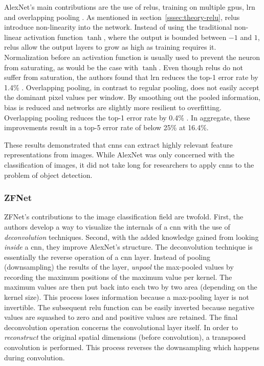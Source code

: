 \documentclass[final]{vutinfth} %
\begin{document}
AlexNet's main contributions are the use of \glspl{relu}, training on
multiple \glspl{gpu}, \gls{lrn} and overlapping pooling
\cite{krizhevsky2012}. As mentioned in
section~\ref{sssec:theory-relu}, \glspl{relu} introduce non-linearity
into the network. Instead of using the traditional non-linear
activation function $\tanh$, where the output is bounded between $-1$
and $1$, \glspl{relu} allow the output layers to grow as high as
training requires it. Normalization before an activation function is
usually used to prevent the neuron from saturating, as would be the
case with $\tanh$. Even though \glspl{relu} do not suffer from
saturation, the authors found that \gls{lrn} reduces the top-1 error
rate by 1.4\% \cite{krizhevsky2012}. Overlapping pooling, in contrast
to regular pooling, does not easily accept the dominant pixel values
per window. By smoothing out the pooled information, bias is reduced
and networks are slightly more resilient to overfitting. Overlapping
pooling reduces the top-1 error rate by 0.4\%
\cite{krizhevsky2012}. In aggregate, these improvements result in a
top-5 error rate of below 25\% at 16.4\%.

These results demonstrated that \glspl{cnn} can extract highly
relevant feature representations from images. While AlexNet was only
concerned with the classification of images, it did not take long for
researchers to apply \glspl{cnn} to the problem of object detection.

\subsubsection{ZFNet}
\label{sssec:theory-zfnet}

ZFNet's \cite{zeiler2014} contributions to the image classification
field are twofold. First, the authors develop a way to visualize the
internals of a \gls{cnn} with the use of \emph{deconvolution}
techniques. Second, with the added knowledge gained from looking
\emph{inside} a \gls{cnn}, they improve AlexNet's structure. The
deconvolution technique is essentially the reverse operation of a
\gls{cnn} layer. Instead of pooling (downsampling) the results of the
layer, \textcite{zeiler2014} \emph{unpool} the max-pooled values by
recording the maximum positions of the maximum value per kernel. The
maximum values are then put back into each two by two area (depending
on the kernel size). This process loses information because a
max-pooling layer is not invertible. The subsequent \gls{relu}
function can be easily inverted because negative values are squashed
to zero and and positive values are retained. The final deconvolution
operation concerns the convolutional layer itself. In order to
\emph{reconstruct} the original spatial dimensions (before
convolution), a transposed convolution is performed. This process
reverses the downsampling which happens during convolution.
\end{document}
